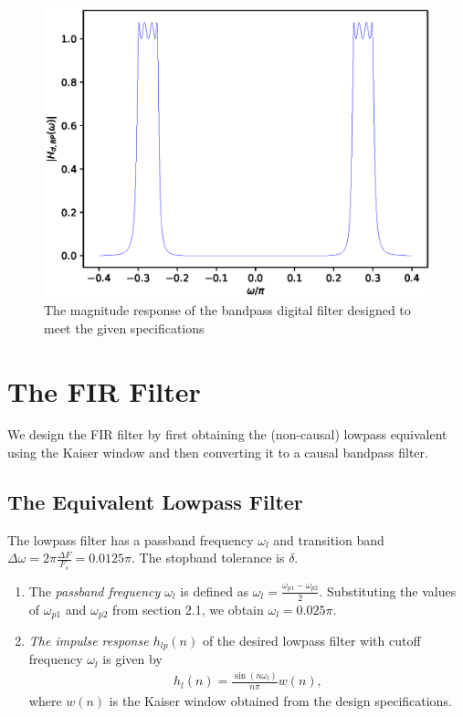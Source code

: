 \documentclass{article}
\begin{document}
\begin{figure}
\label{fig5}
\includegraphics[width = 15cm]{./figs/iir-bandpass-dig.eps}
\caption{The magnitude response of the bandpass digital filter designed to meet the given specifications} 
\end{figure}


\section{The FIR Filter}
We design the FIR filter by first obtaining the (non-causal) lowpass equivalent using the Kaiser window
and then
converting it to a causal bandpass filter.

\subsection{The Equivalent Lowpass Filter}
The lowpass filter has a passband frequency $\omega_l$ and transition band $\Delta \omega = 2\pi \frac{\Delta F}{F_s} = 0.0125\pi$.
The stopband tolerance is $\delta$.
\begin{enumerate}
\item  The {\em passband frequency $\omega_l$}  is defined as $\omega_l = \frac{\omega_{p1} - \omega_{p2}}{2}$.  Substituting the values of $\omega_{p1}$ and $\omega_{p2}$ from section 2.1, we obtain $\omega_l = 0.025\pi$.

\item {\em The impulse response $h_{lp}(n)$} of the desired lowpass filter with cutoff frequency $\omega_l$
is given by
\begin{eqnarray}
\label{firlpdef}
h_l(n) = \frac{\sin(n\omega_l)}{n\pi}w(n),
\end{eqnarray}
where $w(n)$ is the Kaiser window obtained from the design specifications.
\end{enumerate}
\end{document}
